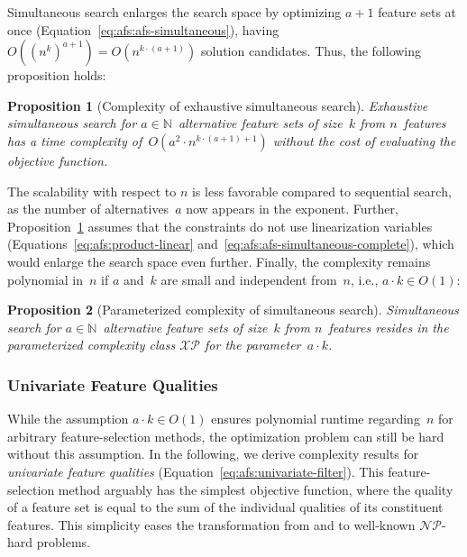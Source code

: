 \documentclass[iicol, sn-basic, Numbered]{sn-jnl} %
\theoremstyle{plain}
\newtheorem{proposition}{Proposition}
\theoremstyle{definition}
\begin{document}
Simultaneous search enlarges the search space by optimizing $a+1$ feature sets at once (Equation~\ref{eq:afs:afs-simultaneous}), having~$O((n^k)^{a+1}) = O(n^{k \cdot (a+1)})$ solution candidates.
Thus, the following proposition holds:
%
\begin{proposition}[Complexity of exhaustive simultaneous search]
	Exhaustive simultaneous search for $a \in \mathbb{N}$~alternative feature sets of size~$k$ from $n$~features has a time complexity of~$O(a^2 \cdot n^{k \cdot (a+1) + 1})$ without the cost of evaluating the objective function.
	\label{prop:afs:complexity-exhaustive-simultaneous-np}
\end{proposition}
%
The scalability with respect to $n$ is less favorable compared to sequential search, as the number of alternatives~$a$ now appears in the exponent.
Further, Proposition~\ref{prop:afs:complexity-exhaustive-simultaneous-np} assumes that the constraints do not use linearization variables (Equations~\ref{eq:afs:product-linear} and~\ref{eq:afs:afs-simultaneous-complete}), which would enlarge the search space even further.
Finally, the complexity remains polynomial in~$n$ if $a$ and~$k$ are small and independent from~$n$, i.e., $a \cdot k \in O(1)$:
%
\begin{proposition}[Parameterized complexity of simultaneous search]
	Simultaneous search for $a \in \mathbb{N}$~alternative feature sets of size~$k$ from $n$~features resides in the parameterized complexity class $\mathcal{XP}$ for the parameter~$a \cdot k$.
	\label{prop:afs:complexity-simultaneous-xp}
\end{proposition}
%

\subsubsection{Univariate Feature Qualities}
\label{sec:afs:approach:complexity:uni}

While the assumption $a \cdot k \in O(1)$ ensures polynomial runtime regarding~$n$ for arbitrary feature-selection methods, the optimization problem can still be hard without this assumption.
In the following, we derive complexity results for \emph{univariate feature qualities} (Equation~\ref{eq:afs:univariate-filter}).
This feature-selection method arguably has the simplest objective function, where the quality of a feature set is equal to the sum of the individual qualities of its constituent features.
This simplicity eases the transformation from and to well-known $\mathcal{NP}$-hard problems.
\end{document}
